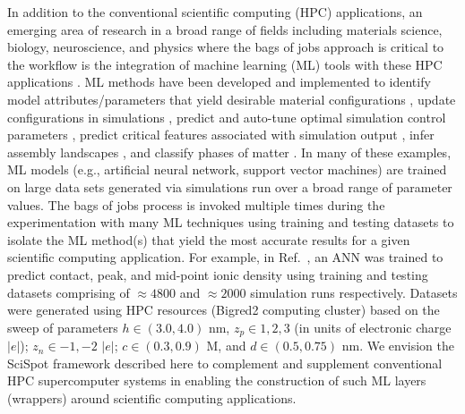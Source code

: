 In addition to the conventional scientific computing (HPC) applications, an emerging area of research in a broad range of fields including materials science, biology, neuroscience, and physics where the bags of jobs approach is critical to the workflow is the integration of machine learning (ML) tools with these HPC applications  \citep{ml.atomic2017,melko2017,sam2017,fu2017,long2015machine, ferguson2017machine,ward2018matminer,jcs1,jcs2,fox2019learning}. ML methods have been developed and implemented to identify model attributes/parameters that yield desirable material configurations \citep{glotzer2017}, update configurations in simulations \citep{botu2015adaptive,fu2017}, predict and auto-tune optimal simulation control parameters \cite{jcs1}, predict critical features associated with simulation output \cite{jcs2}, infer assembly landscapes \citep{long2015machine,ferguson2017machine}, and classify phases of matter \citep{melko2017}. In many of these examples, ML models (e.g., artificial neural network, support vector machines) are trained on large data sets generated via simulations run over a broad range of parameter values. The bags of jobs process is invoked multiple times during the experimentation with many ML techniques using training and testing datasets to isolate the ML method(s) that yield the most accurate results for a given scientific computing application. For example, in Ref.~\cite{jcs2}, an ANN was trained to predict contact, peak, and mid-point ionic density using training and testing datasets comprising of $\approx4800$ and $\approx2000$ simulation runs respectively. Datasets were generated using HPC resources (Bigred2 computing cluster) based on the sweep of parameters $h \in (3.0, 4.0)$ nm,  $z_p \in 1,2,3$ (in units of electronic charge $|e|$); $z_n \in -1,-2$ $|e|$; $c \in (0.3,0.9)$ M, and $d \in (0.5,0.75)$ nm. We envision the SciSpot framework described here to complement and supplement conventional HPC supercomputer systems in enabling the construction of such ML layers (wrappers) \cite{jcs2,fox2019learning} around scientific computing applications. 


